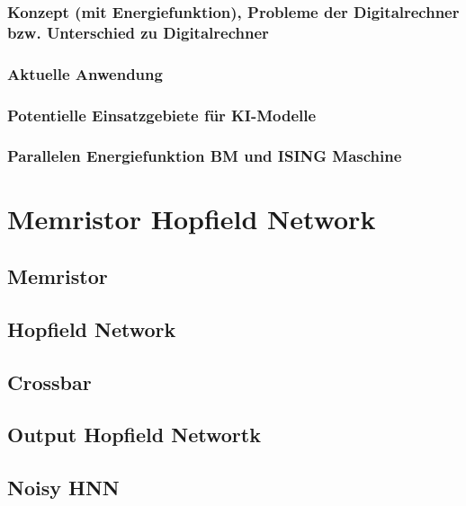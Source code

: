 \subsubsection{Konzept (mit Energiefunktion), Probleme der Digitalrechner bzw. Unterschied zu Digitalrechner}
\subsubsection{Aktuelle Anwendung}
\subsubsection{Potentielle Einsatzgebiete für KI-Modelle}
\subsubsection{Parallelen Energiefunktion BM und ISING Maschine}

\section{Memristor Hopfield Network}
\subsection{Memristor}
\subsection{Hopfield Network}
\subsection{Crossbar}
\subsection{Output Hopfield Networtk}
\subsection{Noisy HNN}
